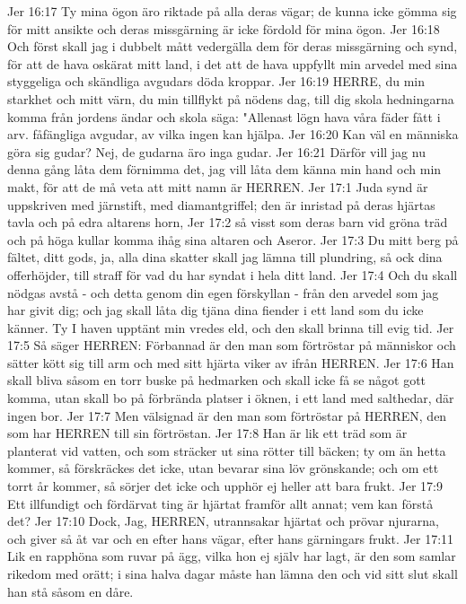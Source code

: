 Jer 16:17  Ty mina ögon äro riktade på alla deras vägar; de kunna icke gömma sig för mitt ansikte och deras missgärning är icke fördold för mina ögon.
Jer 16:18  Och först skall jag i dubbelt mått vedergälla dem för deras missgärning och synd, för att de hava oskärat mitt land, i det att de hava uppfyllt min arvedel med sina styggeliga och skändliga avgudars döda kroppar.
Jer 16:19  HERRE, du min starkhet och mitt värn, du min tillflykt på nödens dag, till dig skola hedningarna komma från jordens ändar och skola säga: "Allenast lögn hava våra fäder fått i arv. fåfängliga avgudar, av vilka ingen kan hjälpa.
Jer 16:20  Kan väl en människa göra sig gudar? Nej, de gudarna äro inga gudar.
Jer 16:21  Därför vill jag nu denna gång låta dem förnimma det, jag vill låta dem känna min hand och min makt, för att de må veta att mitt namn är HERREN.
Jer 17:1  Juda synd är uppskriven med järnstift, med diamantgriffel; den är inristad på deras hjärtas tavla och på edra altarens horn,
Jer 17:2  så visst som deras barn vid gröna träd och på höga kullar komma ihåg sina altaren och Aseror.
Jer 17:3  Du mitt berg på fältet, ditt gods, ja, alla dina skatter skall jag lämna till plundring, så ock dina offerhöjder, till straff för vad du har syndat i hela ditt land.
Jer 17:4  Och du skall nödgas avstå - och detta genom din egen förskyllan - från den arvedel som jag har givit dig; och jag skall låta dig tjäna dina fiender i ett land som du icke känner. Ty I haven upptänt min vredes eld, och den skall brinna till evig tid.
Jer 17:5  Så säger HERREN: Förbannad är den man som förtröstar på människor och sätter kött sig till arm och med sitt hjärta viker av ifrån HERREN.
Jer 17:6  Han skall bliva såsom en torr buske på hedmarken och skall icke få se något gott komma, utan skall bo på förbrända platser i öknen, i ett land med salthedar, där ingen bor.
Jer 17:7  Men välsignad är den man som förtröstar på HERREN, den som har HERREN till sin förtröstan.
Jer 17:8  Han är lik ett träd som är planterat vid vatten, och som sträcker ut sina rötter till bäcken; ty om än hetta kommer, så förskräckes det icke, utan bevarar sina löv grönskande; och om ett torrt år kommer, så sörjer det icke och upphör ej heller att bara frukt.
Jer 17:9  Ett illfundigt och fördärvat ting är hjärtat framför allt annat; vem kan förstå det?
Jer 17:10  Dock, Jag, HERREN, utrannsakar hjärtat och prövar njurarna, och giver så åt var och en efter hans vägar, efter hans gärningars frukt.
Jer 17:11  Lik en rapphöna som ruvar på ägg, vilka hon ej själv har lagt, är den som samlar rikedom med orätt; i sina halva dagar måste han lämna den och vid sitt slut skall han stå såsom en dåre.
